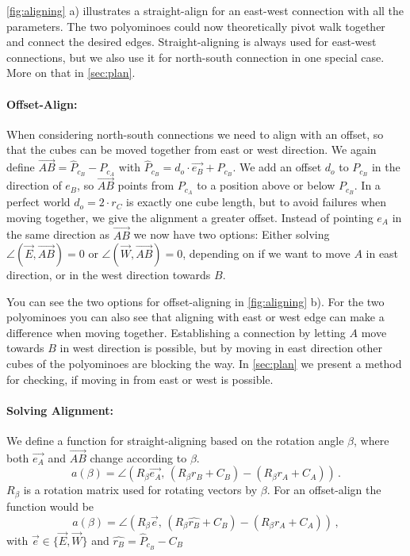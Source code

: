 \autoref{fig:aligning} a) illustrates a straight-align for an east-west connection with all the parameters.
The two polyominoes could now theoretically pivot walk together and connect the desired edges.
Straight-aligning is always used for east-west connections, but we also use it for north-south connection in one special case. More on that in \autoref{sec:plan}.

\paragraph{Offset-Align:}

When considering north-south connections we need to align with an offset, so that the cubes can be moved together from east or west direction.
We again define $\overrightarrow{AB} = \hat{P}_{c_B} - P_{c_A}$ with $\hat{P}_{c_B} = d_o \cdot \vec{e_B} + P_{c_B}$.
We add an offset $d_o$ to $P_{c_B}$ in the direction of $e_B$, so $\overrightarrow{AB}$ points from $P_{c_A}$ to a position above or below $P_{c_B}$.
In a perfect world $d_o = 2 \cdot r_C$ is exactly one cube length, but to avoid failures when moving together, we give the alignment a greater offset.
Instead of pointing $e_A$ in the same direction as $\overrightarrow{AB}$ we now have two options:
Either solving $\angle \left( \vec{E}, \overrightarrow{AB} \right) = 0$ or $\angle \left( \vec{W}, \overrightarrow{AB} \right) = 0$, depending on if we want to move $A$ in east direction, or in the west direction towards $B$.

You can see the two options for offset-aligning in \autoref{fig:aligning} b).
For the two polyominoes you can also see that aligning with east or west edge can make a difference when moving together.
Establishing a connection by letting $A$ move towards $B$ in west direction is possible, but by moving in east direction other cubes of the polyominoes are blocking the way.
In \autoref{sec:plan} we present a method for checking, if moving in from east or west is possible. 

\paragraph{Solving Alignment:}

We define a function for straight-aligning based on the rotation angle $\beta$, where both $\vec{e_A}$ and $\overrightarrow{AB}$ change according to $\beta$.
\begin{equation*}
a(\beta) = \angle \left( R_\beta \vec{e_A}, \, \left( R_\beta r_B + C_B \right) - \left( R_\beta r_A + C_A \right)\right) \,.
\end{equation*}
$R_\beta$ is a rotation matrix used for rotating vectors by $\beta$.
For an offset-align the function would be
\begin{equation*}
a(\beta) = \angle \left( R_\beta \vec{e}, \, \left( R_\beta \hat{r_B} + C_B \right) - \left( R_\beta r_A + C_A \right)\right) \,,
\end{equation*}
with $\vec{e} \in \{ \vec{E}, \vec{W}\}$ and $\hat{r_B} = \hat{P}_{c_B} - C_B$

